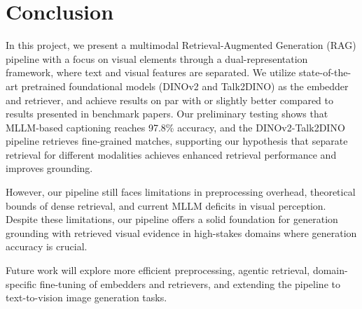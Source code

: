 \section{Conclusion}

In this project, we present a multimodal Retrieval-Augmented Generation (RAG) pipeline with a focus on visual elements
through a dual-representation framework, where text and visual features are separated.
We utilize state-of-the-art pretrained foundational models (DINOv2 and Talk2DINO) as the embedder and retriever,
and achieve results on par with or slightly better compared to results presented in benchmark papers.
Our preliminary testing shows that MLLM-based captioning reaches 97.8\% accuracy,
and the DINOv2-Talk2DINO pipeline retrieves fine-grained matches, 
supporting our hypothesis that separate retrieval for different modalities achieves enhanced retrieval performance 
and improves grounding.

However, our pipeline still faces limitations in preprocessing overhead, theoretical bounds of dense retrieval,
and current MLLM deficits in visual perception.
Despite these limitations, our pipeline offers a solid foundation for generation grounding with retrieved visual evidence 
in high-stakes domains where generation accuracy is crucial.

Future work will explore more efficient preprocessing, agentic retrieval, domain-specific fine-tuning of embedders and retrievers,
and extending the pipeline to text-to-vision image generation tasks.
